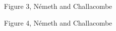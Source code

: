 \documentclass[prl,aps,preprint,superbib,12pt]{revtex4}
\begin{document}
{\clearpage

\begin{center}
Figure 3, N{\'e}meth and Challacombe \\[1.cm]
\end{center}

\clearpage

\begin{center}
Figure 4, N{\'e}meth and Challacombe \\[1.cm]
\end{center}

\clearpage

}
\end{document}
